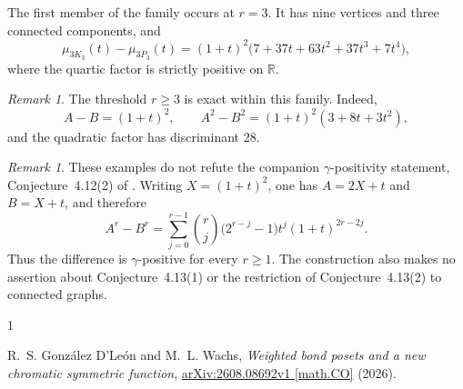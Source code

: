 \documentclass[11pt]{amsart}
\theoremstyle{remark}
\newtheorem{remark}[theorem]{Remark}
\begin{document}
The first member of the family occurs at $r=3$. It has nine vertices
and three connected components, and
\[
\mu_{3K_3}(t)-\mu_{3P_3}(t)
=(1+t)^2\bigl(7+37t+63t^2+37t^3+7t^4\bigr),
\]
where the quartic factor is strictly positive on $\mathbb{R}$.

\begin{remark}
The threshold $r\geq3$ is exact within this family. Indeed,
\[
A-B=(1+t)^2,
\qquad
A^2-B^2=(1+t)^2(3+8t+3t^2),
\]
and the quadratic factor has discriminant $28$.
\end{remark}

\begin{remark}
These examples do not refute the companion $\gamma$-positivity
statement, Conjecture~4.12(2) of \cite{GDLW}. Writing
$X=(1+t)^2$, one has $A=2X+t$ and $B=X+t$, and therefore
\[
A^r-B^r
=\sum_{j=0}^{r-1}
\binom{r}{j}\bigl(2^{r-j}-1\bigr)
t^j(1+t)^{2r-2j}.
\]
Thus the difference is $\gamma$-positive for every $r\geq1$.
The construction also makes no assertion about Conjecture~4.13(1)
or the restriction of Conjecture~4.13(2) to connected graphs.
\end{remark}

\begin{thebibliography}{1}

R.~S. Gonz\'alez D'Le\'on and M.~L. Wachs,
\emph{Weighted bond posets and a new chromatic symmetric function},
\href{https://arxiv.org/abs/2608.08692v1}
{arXiv:2608.08692v1 [math.CO]} (2026).

\end{thebibliography}
\end{document}
